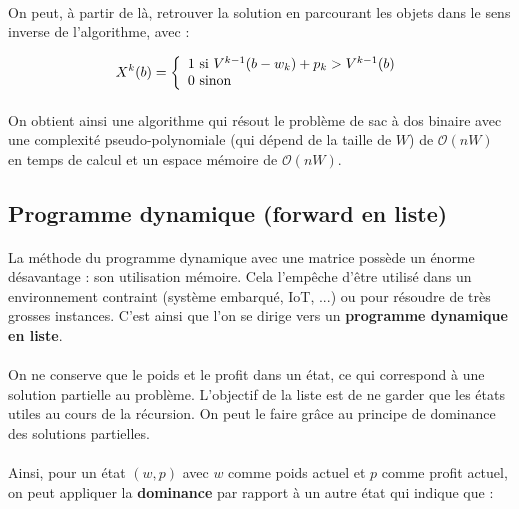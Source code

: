 \documentclass[12pt]{article}
\begin{document}
\paragraph{}On peut, à partir de là, retrouver la solution en parcourant les objets dans le sens inverse de l'algorithme, avec :

\[
X^k(b) = \left\{
	\begin{array}{ll}
		1 \textnormal{ si } V^{k-1}(b-w_k)+p_k > V^{k-1}(b) \\
		0 \textnormal{ sinon} 
	\end{array}
	\right.
\]

\paragraph{}On obtient ainsi une algorithme qui résout le problème de sac à dos binaire avec une complexité pseudo-polynomiale (qui dépend de la taille de $W$) de $\mathcal{O}(nW)$ en temps de calcul et un espace mémoire de $\mathcal{O}(nW)$.

\subsection{Programme dynamique (forward en liste)}

\paragraph{}La méthode du programme dynamique avec une matrice possède un énorme désavantage : son utilisation mémoire. Cela l'empêche d'être utilisé dans un environnement contraint (système embarqué, IoT, ...) ou pour résoudre de très grosses instances. C'est ainsi que l'on se dirige vers un \textbf{programme dynamique en liste}.

\paragraph{}On ne conserve que le poids et le profit dans un état, ce qui correspond à une solution partielle au problème. L'objectif de la liste est de ne garder que les états utiles au cours de la récursion. On peut le faire grâce au principe de dominance des solutions partielles.

\paragraph{}Ainsi, pour un état $(w,p)$ avec $w$ comme poids actuel et $p$ comme profit actuel, on peut appliquer la \textbf{dominance} par rapport à un autre état qui indique que :
\end{document}
